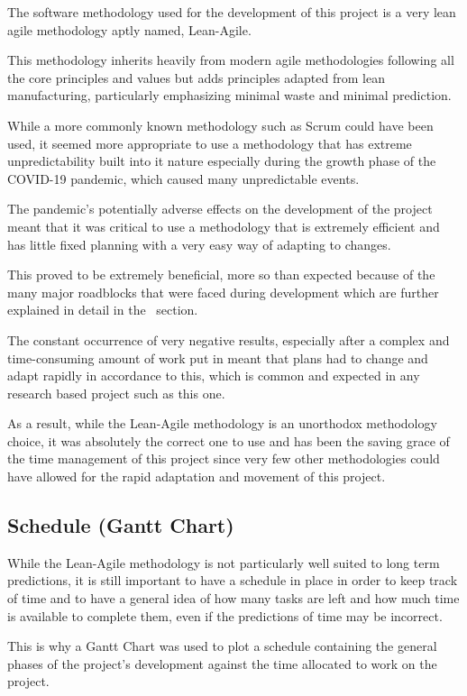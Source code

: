 \documentclass[12pt]{article}
\newcommand{\sentence}{} %
\begin{document}
    \tab
    The software methodology used for the development of this project is a very lean agile methodology aptly named,
    Lean-Agile.
    \sentence
    This methodology inherits heavily from modern agile methodologies following all the core principles and values
    but adds principles adapted from lean manufacturing, particularly emphasizing minimal waste and minimal
    prediction.
    \sentence
    While a more commonly known methodology such as Scrum could have been used, it seemed more appropriate to use a
    methodology that has extreme unpredictability built into it nature especially during the growth phase of the
    COVID-19 pandemic, which caused many unpredictable events.
    \sentence
    The pandemic's potentially adverse effects on the development of the project meant that it was critical to use a
    methodology that is extremely efficient and has little fixed planning with a very easy way of adapting to changes.
    \sentence
    This proved to be extremely beneficial, more so than expected because of the many major roadblocks that were
    faced during development which are further explained in detail in the~ section.
    \sentence
    The constant occurrence of very negative results, especially after a complex and time-consuming amount of work
    put in meant that plans had to change and adapt rapidly in accordance to this, which is common and expected in
    any research based project such as this one.
    \sentence
    As a result, while the Lean-Agile methodology is an unorthodox methodology choice, it was absolutely the correct
    one to use and has been the saving grace of the time management of this project since very few other
    methodologies could have allowed for the rapid adaptation and movement of this project.

    \subsection{Schedule (Gantt Chart)}\label{subsec:schedule-(gantt-chart)}


    \tab
    While the Lean-Agile methodology is not particularly well suited to long term predictions, it is still important
    to have a schedule in place in order to keep track of time and to have a general idea of how many tasks are left
    and how much time is available to complete them, even if the predictions of time may be incorrect.
    \sentence
    This is why a Gantt Chart was used to plot a schedule containing the general phases of the project's development
    against the time allocated to work on the project.
\end{document}

